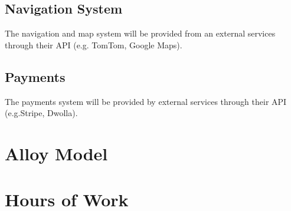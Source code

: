 \documentclass[english]{article}
\begin{document}
\subsection{Navigation System}
	The navigation and map system will be provided from an external services through their API (e.g. TomTom, Google Maps).
\subsection{Payments}
	The payments system will be provided by external services through their API (e.g.Stripe, Dwolla).

\section{Alloy Model}
	
	
	

\section{Hours of Work}
\end{document}

